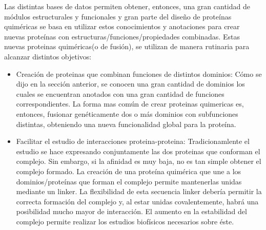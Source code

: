 Las distintas bases de datos permiten obtener, entonces, una gran cantidad de módulos estructurales y funcionales y gran 
parte del diseño de proteínas quiméricas se basa en utilizar estos conocimientos y anotaciones para crear nuevas proteínas con estructuras/funciones/propiedades combinadas.
Estas nuevas proteinas quiméricas(o de fusión), se utilizan de manera rutinaria para alcanzar distintos objetivos:

\begin{itemize}
 \item Creación de proteinas que combinan funciones de distintos dominios:
Cómo se dijo en la sección anterior, se conocen una gran cantidad de dominios los cuales se encuentran anotados con una gran cantidad de funciones correspondientes.
La forma mas común de crear proteinas quimericas es, entonces, fusionar genéticamente dos o más dominios con subfunciones distintas, obteniendo una nueva funcionalidad global para la proteína.
\item Facilitar el estudio de interacciones proteina-proteina\cite{reddy2013linkers}: 
Tradicionamlente el estudio se hace expresando conjuntamente las dos proteinas que conforman el complejo.
Sin embargo, si la afinidad es muy baja, no es tan simple obtener el complejo formado.
La creación de una proteína quimérica que une a los dominios/proteínas que forman el complejo permite mantenerlas unidas mediante un linker.
La flexibilidad de esta secuencia linker debería permitir la correcta formación del complejo y, al estar unidas covalentemente, habrá una posibilidad mucho mayor de interacción.
El aumento en la estabilidad del complejo permite realizar los estudios biofísicos necesarios sobre éste.

\end{itemize}
